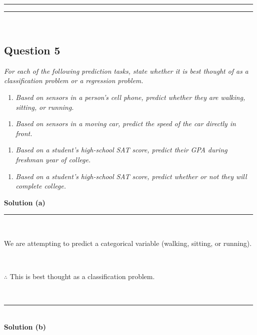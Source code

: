 \documentclass{article}
\begin{document}
\noindent\rule{\textwidth}{0.4pt}
\noindent\rule{\textwidth}{0.4pt}\\

\newpage

\newpage

\subsection*{Question 5}
\textit{For each of the following prediction tasks, state whether it is best thought of as a classification problem
or a regression problem.}\\

\begin{enumerate}[label=(a)]
  \item \textit{Based on sensors in a person's cell phone, predict whether they are walking, sitting, or running.}
\end{enumerate}

\begin{enumerate}[label=(b)]
  \item \textit{Based on sensors in a moving car, predict the speed of the car directly in front.}
\end{enumerate}

\begin{enumerate}[label=(c)]
  \item \textit{Based on a student's high-school SAT score, predict their GPA during freshman year of college.}
\end{enumerate}

\begin{enumerate}[label=(d)]
  \item \textit{Based on a student's high-school SAT score, predict whether or not they will complete college.}
\end{enumerate}

\textbf{Solution (a)}

\noindent\rule{\textwidth}{0.4pt}\\

\parbox{\textwidth}{We are attempting to predict a categorical variable (walking, sitting, or running).}\\

\parbox{\textwidth}{$\therefore$ This is best thought as a classification problem.}\\

\noindent\rule{\textwidth}{0.4pt}\\

\textbf{Solution (b)}
\end{document}
